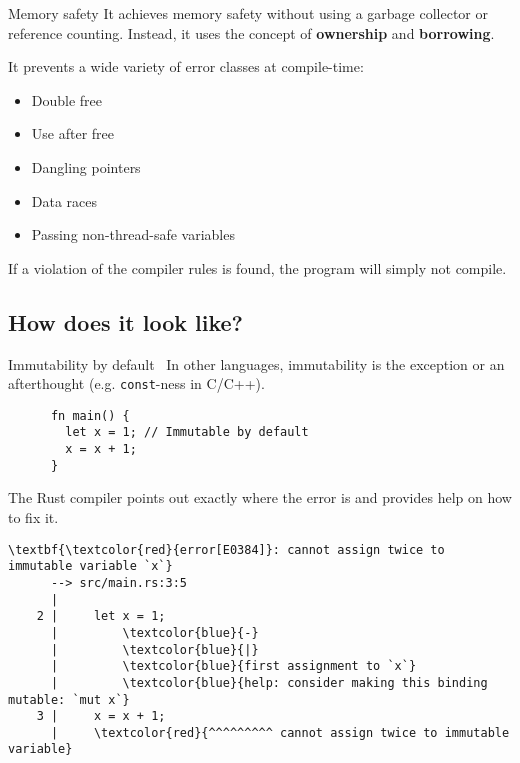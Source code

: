 \documentclass{beamer}
\begin{document}
\begin{frame}{Memory safety}
  It achieves memory safety without using a garbage collector or reference counting.
  Instead, it uses the concept of \textbf{ownership} and \textbf{borrowing}.

  \vfill
  \pause

  It prevents a wide variety of error classes at compile-time:

  \begin{itemize}
    \item Double free
    \item Use after free
    \item Dangling pointers
    \item Data races
    \item Passing non-thread-safe variables
  \end{itemize}

  \vfill

  If a violation of the compiler rules is found, the program will simply not compile.
\end{frame}

\subsection{How does it look like?}

\begin{frame}[fragile]{Immutability by default}\
  \scriptsize
  In other languages, immutability is the exception or an afterthought (e.g. \texttt{const}-ness in C/C++).

  \begin{listing}
    \begin{verbatim}
      fn main() {
        let x = 1; // Immutable by default
        x = x + 1;
      }
    \end{verbatim}
  \end{listing}

  \vfill
  The Rust compiler points out exactly where the error is and provides help on how to fix it.

  \begin{listing}
    \scriptsize
    \begin{Verbatim}[commandchars=\\\{\}]
      \textbf{\textcolor{red}{error[E0384]}: cannot assign twice to immutable variable `x`}
      --> src/main.rs:3:5
      |
    2 |     let x = 1;
      |         \textcolor{blue}{-}
      |         \textcolor{blue}{|}
      |         \textcolor{blue}{first assignment to `x`}
      |         \textcolor{blue}{help: consider making this binding mutable: `mut x`}
    3 |     x = x + 1;
      |     \textcolor{red}{^^^^^^^^^ cannot assign twice to immutable variable}
    \end{Verbatim}
  \end{listing}
\end{frame}
\end{document}
